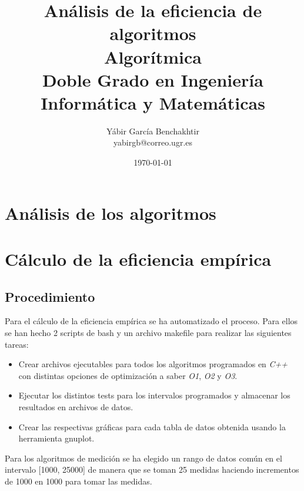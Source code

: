 \documentclass{article}
\begin{document}
\title{%
  \huge Análisis de la eficiencia de algoritmos \\[5mm]
  \Large Algorítmica\\
  \normalsize Doble Grado en Ingeniería Informática y Matemáticas\\[5cm]
}
\author{Yábir García Benchakhtir \\ yabirgb@correo.ugr.es \\[10cm]}

\date{\today}
\maketitle

\newpage
\tableofcontents
\newpage

\section{Análisis de los algoritmos}

\section{Cálculo de la eficiencia empírica}

\subsection{Procedimiento}

Para el cálculo de la eficiencia empírica se ha automatizado el
proceso. Para ellos se han hecho 2 scripts de bash y un archivo
makefile para realizar las siguientes tareas:

\begin{itemize}
\item Crear archivos ejecutables para todos los algoritmos programados
  en \textit{C++} con distintas opciones de optimización a saber
  \textit{O1}, \textit{O2} y \textit{O3}.
\item Ejecutar los distintos tests para los intervalos programados y
  almacenar los resultados en archivos de datos.
\item Crear las respectivas gráficas para cada tabla de datos obtenida usando la herramienta gnuplot.
\end{itemize}

Para los algoritmos de medición se ha elegido un rango de datos común
en el intervalo [1000, 25000] de manera que se toman 25 medidas
haciendo incrementos de 1000 en 1000 para tomar las medidas.
\end{document}
